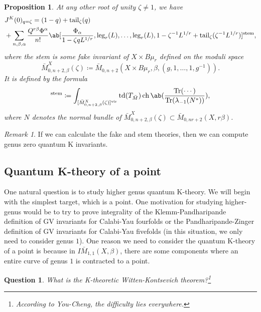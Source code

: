 \documentclass{amsart}
\newtheorem{prop}[thm]{Proposition}
\newtheorem{quest}[thm]{Question}
\theoremstyle{definition}
\theoremstyle{remark}
\newtheorem{rmk}[thm]{Remark}
\theoremstyle{plain}
\theoremstyle{definition}
\theoremstyle{remark}
\newcommand{\mr}[1]{\mathrm{#1}}
\newcommand{\on}[1]{\operatorname{#1}}
\newcommand{\1}{\mathbf{1}}
\newcommand{\2}{\mathbf{2}}
\newcommand{\3}{\mathbf{3}}
\newcommand{\vir}{\mr{vir}}
\begin{document}
\begin{prop}
    At any other root of unity \(\zeta \neq 1\), we have
    \begin{align*}
        &J^K(0)_{q = \zeta} = (1-q) + \mr{tail}_{\zeta}(q) \\
        &+ \sum_{n,\beta,\alpha} \frac{Q^{r\beta}\Phi^{\alpha}}{n!} \ab[\frac{\Phi_{\alpha}}{1-\zeta q L^{1/r}}, \mr{leg}_r(L), \ldots, \mr{leg}_r(L), 1 - \zeta^{-1}L^{1/r} + \mr{tail}_{\zeta}(\zeta^{-1} L^{1/r})]^{\mr{stem}},
    \end{align*}
    where the stem is some fake invariant of \(X \times B\mu_r\) defined on the moduli space
    \[ \bar{M}_{0,n+2,\beta}^X(\zeta) \coloneqq \bar{M}_{0,n+2}(X \times B\mu_r, \beta, (g, 1, \ldots, 1, g^{-1})). \]
    It is defined by the formula
    \begin{align*}
        [\cdots]^{\mr{stem}} \coloneqq \int_{[\bar{M}_{0,n+2,\beta}^X(\zeta)]^{\vir}} \on{td}(T_{\bar{M}}) \on{ch}\ab(\frac{\on{Tr}(\cdots)}{\on{Tr}(\lambda_{-1}(N^*))}), 
    \end{align*}
    where \(N\) denotes the normal bundle of \(\bar{M}_{0,n+2,\beta}^X(\zeta) \subset \bar{M}_{0,nr+2}(X, r\beta)\).
\end{prop}

\begin{rmk}
    If we can calculate the fake and stem theories, then we can compute genus zero quantum K invariants.
\end{rmk}

\subsection{Quantum K-theory of a point}%
\label{sub:Quantum K-theory of a point}

One natural question is to study higher genus quantum K-theory. We will begin with the simplest target, which is a point. One motivation for studying higher-genus would be to try to prove integrality of the Klemm-Pandharipande definition of GV invariants for Calabi-Yau fourfolds or the Pandharipande-Zinger definition of GV invariants for Calabi-Yau fivefolds (in this situation, we only need to consider genus \(1\)). One reason we need to consider the quantum K-theory of a point is because in \(I\bar{M}_{1,1}(X, \beta)\), there are some components where an entire curve of genus \(1\) is contracted to a point.

\begin{quest}
    What is the K-theoretic Witten-Kontsevich theorem?\footnote{According to You-Cheng, the difficulty lies everywhere.}
\end{quest}
\end{document}
